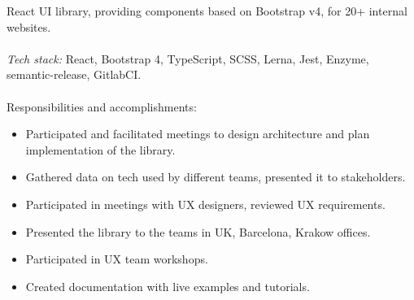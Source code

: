 \documentclass[a4paper, 14pt]{article}
\begin{document}
  React UI library, providing components based on Bootstrap v4, for 20+ internal websites. \\
  \\
    \textit{Tech stack:} React, Bootstrap 4, TypeScript, SCSS, Lerna, Jest, Enzyme, semantic-release, GitlabCI. \\
  \\
  Responsibilities and accomplishments:
    \begin{itemize}
      \item Participated and facilitated meetings to design architecture and plan implementation of the library. \\
      \item Gathered data on tech used by different teams, presented it to stakeholders. \\
      \item Participated in meetings with UX designers, reviewed UX requirements. \\
      \item Presented the library to the teams in UK, Barcelona, Krakow offices. \\
      \item Participated in UX team workshops. \\
      \item Created documentation with live examples and tutorials. \\
    \end{itemize}
\end{document}
